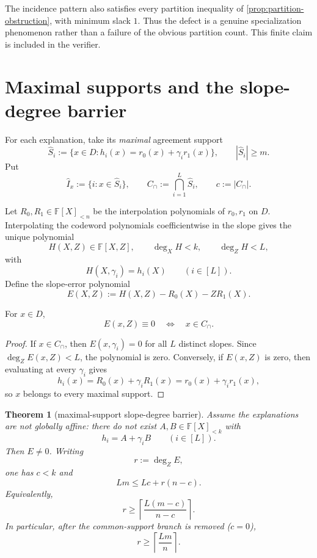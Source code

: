 \documentclass[11pt,a4paper]{amsart}
\numberwithin{equation}{section}
\newtheorem{theorem}{Theorem}[section]
\theoremstyle{remark}
\newcommand{\F}{\mathbb F}\newcommand{\B}{\mathbb B}\newcommand{\K}{\mathbb K}\newcommand{\Z}{\mathbb Z}
\newcommand{\ceil}[1]{\left\lceil #1\right\rceil}\newcommand{\defeq}{\coloneqq}
\begin{document}
The incidence pattern also satisfies every partition inequality of \cref{prop:partition-obstruction}, with minimum slack $1$.  Thus the defect is a genuine specialization phenomenon rather than a failure of the obvious partition count.  This finite claim is included in the verifier.

\section{Maximal supports and the slope-degree barrier}

For each explanation, take its \emph{maximal} agreement support
\[
 \widehat S_i
 :=\{x\in D:h_i(x)=r_0(x)+\gamma_i r_1(x)\},
 \qquad |\widehat S_i|\ge m.
\]
Put
\[
 \widehat I_x:=\{i:x\in\widehat S_i\},
 \qquad
 C_\cap:=\bigcap_{i=1}^{L}\widehat S_i,
 \qquad c:=|C_\cap|.
\]

Let $R_0,R_1\in\F[X]_{<n}$ be the interpolation polynomials of $r_0,r_1$ on $D$.  Interpolating the codeword polynomials coefficientwise in the slope gives the unique polynomial
\[
 H(X,Z)\in\F[X,Z],
 \qquad
 \deg_X H<k,
 \qquad
 \deg_Z H<L,
\]
with
\[
 H(X,\gamma_i)=h_i(X)
 \qquad(i\in[L]).
\]
Define the slope-error polynomial
\[
 E(X,Z):=H(X,Z)-R_0(X)-ZR_1(X).
\]

\begin{lemma}\label{lem:zero-fibers}
For $x\in D$,
\[
 E(x,Z)\equiv0
 \quad\Longleftrightarrow\quad
 x\in C_\cap.
\]
\end{lemma}

\begin{proof}
If $x\in C_\cap$, then $E(x,\gamma_i)=0$ for all $L$ distinct slopes.  Since $\deg_ZE(x,Z)<L$, the polynomial is zero.  Conversely, if $E(x,Z)$ is zero, then evaluating at every $\gamma_i$ gives
\[
 h_i(x)=R_0(x)+\gamma_iR_1(x)=r_0(x)+\gamma_i r_1(x),
\]
so $x$ belongs to every maximal support.
\end{proof}

\begin{theorem}[maximal-support slope-degree barrier]\label{thm:slope-degree}
Assume the explanations are not globally affine: there do not exist $A,B\in\F[X]_{<k}$ with
\[
 h_i=A+\gamma_iB
 \qquad(i\in[L]).
\]
Then $E\ne0$.  Writing
\[
 r:=\deg_ZE,
\]
one has $c<k$ and
\[
 \boxed{
 Lm\le Lc+r(n-c).
 }
\]
Equivalently,
\[
 \boxed{
 r\ge
 \ceil{\frac{L(m-c)}{n-c}}.
 }
\]
In particular, after the common-support branch is removed ($c=0$),
\[
 r\ge\ceil{\frac{Lm}{n}}.
\]
\end{theorem}
\end{document}
